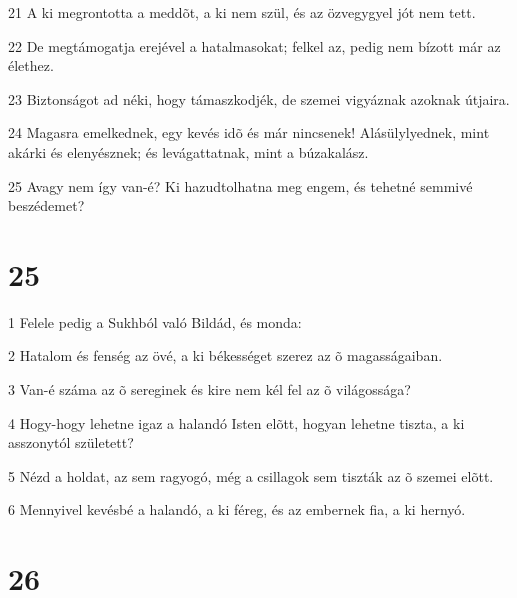 \par 21 A ki megrontotta a meddõt, a ki nem szül, és az özvegygyel jót nem tett.
\par 22 De megtámogatja erejével a hatalmasokat; felkel az, pedig nem bízott már az élethez.
\par 23 Biztonságot ad néki, hogy támaszkodjék, de szemei vigyáznak azoknak útjaira.
\par 24 Magasra emelkednek, egy kevés idõ és már nincsenek! Alásülylyednek, mint akárki és elenyésznek; és levágattatnak, mint a búzakalász.
\par 25 Avagy nem így van-é? Ki hazudtolhatna meg engem, és tehetné semmivé beszédemet?

\chapter{25}

\par 1 Felele pedig a Sukhból való Bildád, és monda:
\par 2 Hatalom és fenség az övé, a ki békességet szerez az õ magasságaiban.
\par 3 Van-é száma az õ sereginek és kire nem kél fel az õ világossága?
\par 4 Hogy-hogy lehetne igaz a halandó Isten elõtt, hogyan lehetne tiszta, a ki asszonytól született?
\par 5 Nézd a holdat, az sem ragyogó, még a csillagok sem tiszták az õ szemei elõtt.
\par 6 Mennyivel kevésbé a halandó, a ki féreg, és az embernek fia, a ki hernyó.

\chapter{26}

